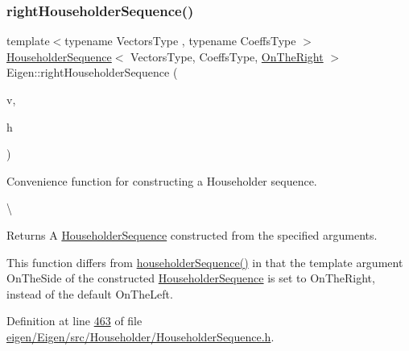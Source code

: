 \subsubsection{\texorpdfstring{right\+Householder\+Sequence()}{rightHouseholderSequence()}}
{\footnotesize\ttfamily template$<$typename Vectors\+Type , typename Coeffs\+Type $>$ \\
\hyperlink{group___householder___module_class_eigen_1_1_householder_sequence}{Householder\+Sequence}$<$ Vectors\+Type, Coeffs\+Type, \hyperlink{group__enums_ggac22de43beeac7a78b384f99bed5cee0ba99dc75d8e00b6c3a5bdc31940f47492b}{On\+The\+Right} $>$ Eigen\+::right\+Householder\+Sequence (\begin{DoxyParamCaption}\item[{const Vectors\+Type \&}]{v,  }\item[{const Coeffs\+Type \&}]{h }\end{DoxyParamCaption})}



Convenience function for constructing a Householder sequence. 

\textbackslash{} \begin{DoxyReturn}{Returns}
A \hyperlink{group___householder___module_class_eigen_1_1_householder_sequence}{Householder\+Sequence} constructed from the specified arguments.
\end{DoxyReturn}
This function differs from \hyperlink{group___householder___module_ga4bd4b85120e014cf1125a054b02d4d92}{householder\+Sequence()} in that the template argument {\ttfamily On\+The\+Side} of the constructed \hyperlink{group___householder___module_class_eigen_1_1_householder_sequence}{Householder\+Sequence} is set to On\+The\+Right, instead of the default On\+The\+Left. 

Definition at line \hyperlink{eigen_2_eigen_2src_2_householder_2_householder_sequence_8h_source_l00463}{463} of file \hyperlink{eigen_2_eigen_2src_2_householder_2_householder_sequence_8h_source}{eigen/\+Eigen/src/\+Householder/\+Householder\+Sequence.\+h}.

